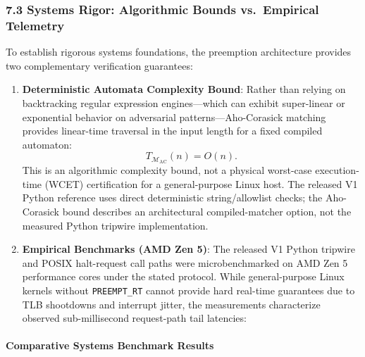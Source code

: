 \documentclass[
  10pt,letterpaper]{article}
\begin{document}
\subsubsection{7.3 Systems Rigor: Algorithmic Bounds vs.~Empirical
Telemetry}\label{systems-rigor-bounded-automata-wcet-vs.-empirical-telemetry}

To establish rigorous systems foundations, the preemption architecture
provides two complementary verification guarantees:

\begin{enumerate}
\def\labelenumi{\arabic{enumi}.}
\item
  \textbf{Deterministic Automata Complexity Bound}: Rather than relying
  on backtracking regular expression engines---which can exhibit
  super-linear or exponential behavior on adversarial patterns---Aho-Corasick
  matching provides linear-time traversal in the input length for a fixed
  compiled automaton: \[T_{\mathcal{M}_{\text{AC}}}(n) = O(n).\]
  This is an algorithmic complexity bound, not a physical worst-case
  execution-time (WCET) certification for a general-purpose Linux host. The
  released V1 Python reference uses direct deterministic string/allowlist
  checks; the Aho-Corasick bound describes an architectural compiled-matcher
  option, not the measured Python tripwire implementation.
\item
  \textbf{Empirical Benchmarks (AMD Zen 5)}: The released V1 Python
  tripwire and POSIX halt-request call paths were microbenchmarked on AMD
  Zen 5 performance cores under the stated protocol. While general-purpose
  Linux kernels without \texttt{PREEMPT\_RT} cannot provide hard real-time
  guarantees due to TLB shootdowns and interrupt jitter, the measurements
  characterize observed sub-millisecond request-path tail latencies:
\end{enumerate}

\paragraph{Comparative Systems Benchmark
Results}\label{comparative-systems-benchmark-results}
\end{document}
